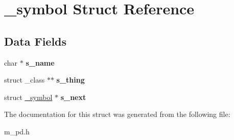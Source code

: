 \hypertarget{struct__symbol}{}\section{\+\_\+symbol Struct Reference}
\label{struct__symbol}
\subsection*{Data Fields}
\begin{DoxyCompactItemize}
\item 
\mbox{\label{struct__symbol_a6c480a00c7475fce44b4175337e1bd6b}} 
char $\ast$ {\bfseries s\+\_\+name}
\item 
\mbox{\label{struct__symbol_a7595b2e847944a2233e371c38857275f}} 
struct \+\_\+class $\ast$$\ast$ {\bfseries s\+\_\+thing}
\item 
\mbox{\label{struct__symbol_ad222ee633bd80a4166b5c4a36212fa8e}} 
struct \hyperlink{struct__symbol}{\+\_\+symbol} $\ast$ {\bfseries s\+\_\+next}
\end{DoxyCompactItemize}


The documentation for this struct was generated from the following file\+:\begin{DoxyCompactItemize}
\item 
m\+\_\+pd.\+h\end{DoxyCompactItemize}
